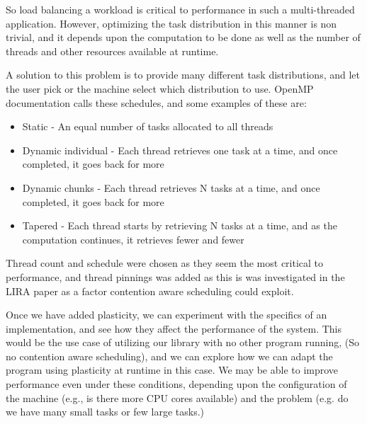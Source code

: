 So load balancing a workload is critical to performance in such a multi-threaded application. However, optimizing the task distribution in this manner is non trivial, and it depends upon the computation to be done as well as the number of threads and other resources available at runtime.

A solution to this problem is to provide many different task distributions, and let the user pick or the machine select which distribution to use. OpenMP documentation calls these schedules, and some examples of these are:

\begin{itemize}
	\item Static - An equal number of tasks allocated to all threads
	\item Dynamic individual - Each thread retrieves one task at a time, and once completed, it goes back for more
	\item Dynamic chunks - Each thread retrieves N tasks at a time, and once completed, it goes back for more
	\item Tapered - Each thread starts by retrieving N tasks at a time, and as the computation continues, it retrieves fewer and fewer
\end{itemize}

Thread count and schedule were chosen as they seem the most critical to performance, and thread pinnings was added as this is was investigated in the LIRA paper \cite{lira} as a factor contention aware scheduling could exploit.

Once we have added plasticity, we can experiment with the specifics of an implementation, and see how they affect the performance of the system. This would be the use case of utilizing our library with no other program running, (So no contention aware scheduling), and we can explore how we can adapt the program using plasticity at runtime in this case. We may be able to improve performance even under these conditions, depending upon the configuration of the machine (e.g., is there more CPU cores available) and the problem (e.g. do we have many small tasks or few large tasks.) 



